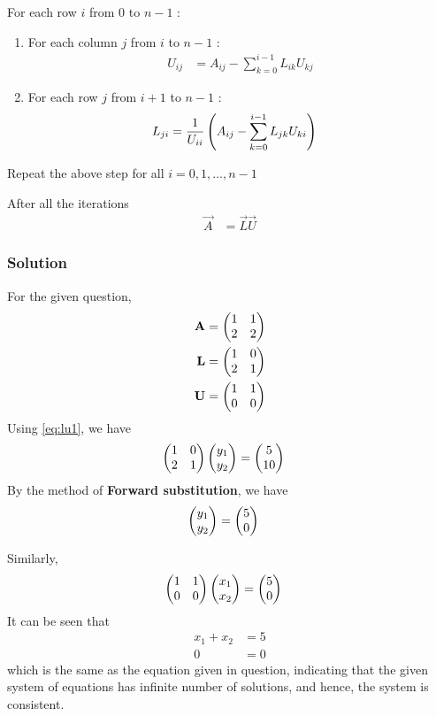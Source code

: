 \documentclass{beamer}
\begin{document}
\begin{frame}
	\item For each row $i$ from $0$ to $n-1$ :
	\begin{enumerate}
		\item For each column $j$ from $i$ to $n-1$ : 
		\begin{align}
			U_{ij} &= A_{ij} - \sum_{k=0}^{i-1} L_{ik} U_{kj}
		\end{align}
		\item For each row $j$ from $i+1$ to $n-1$ :
		\begin{align}
			L_{ji} &= \frac{1}{U_{ii}} \left(A_{ij} - \sum_{k=0}^{i-1} L_{jk} U_{ki}\right)
		\end{align}
	\end{enumerate}
	\item Repeat the above step for all $i = 0,1,\dots,n-1$
	\item After all the iterations
	\begin{align}
		\vec{A} &= \vec{L} \vec{U}
	\end{align}
\end{frame}

\begin{frame}
\frametitle{Solution}
For the given question, 
\begin{align}
	\mathbf{A} &= \begin{pmatrix}1 & 1 \\ 2 & 2\end{pmatrix} \\
	\mathbf{L} &= \begin{pmatrix}1 & 0 \\ 2 & 1\end{pmatrix} \\
	\mathbf{U} &= \begin{pmatrix}1 & 1 \\ 0 & 0\end{pmatrix}
\end{align}
Using \eqref{eq:lu1}, we have
\begin{align}
	\begin{pmatrix}1 & 0 \\ 2 & 1\end{pmatrix} \begin{pmatrix}y_{1} \\ y_{2}\end{pmatrix} &= \begin{pmatrix}5 \\ 10\end{pmatrix}
\end{align}
By the method of \textbf{Forward substitution}, we have
\begin{align}
	\begin{pmatrix}y_{1} \\ y_{2}\end{pmatrix} &= \begin{pmatrix}5 \\ 0\end{pmatrix}
\end{align}

\end{frame}

\begin{frame}
Similarly, 
\begin{align}
	\begin{pmatrix}1 & 1 \\ 0 & 0\end{pmatrix} \begin{pmatrix}x_{1} \\ x_{2}\end{pmatrix} &= \begin{pmatrix}5 \\ 0\end{pmatrix} \label{eq:ans2}
\end{align}
It can be seen that
\begin{align}
	x_{1} + x_{2} &= 5 \label{eq:ans} \\
	0 &= 0
\end{align}
which is the same as the equation given in question, indicating that the given system of equations has infinite number of solutions, and hence, the system is consistent.
\end{frame}
\end{document}
